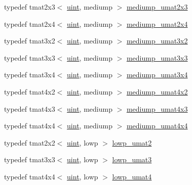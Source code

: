 \begin{DoxyCompactItemize}
typedef tmat2x3$<$ \hyperlink{stb__image_8c_a91ad9478d81a7aaf2593e8d9c3d06a14}{uint}, mediump $>$ \hyperlink{group__gtc__matrix__integer_ga23dfc19249ad27dc4b02615f1d045ba1}{mediump\+\_\+umat2x3}
\item 
typedef tmat2x4$<$ \hyperlink{stb__image_8c_a91ad9478d81a7aaf2593e8d9c3d06a14}{uint}, mediump $>$ \hyperlink{group__gtc__matrix__integer_ga972445669c6e6652716f3f0b664b94cd}{mediump\+\_\+umat2x4}
\item 
typedef tmat3x2$<$ \hyperlink{stb__image_8c_a91ad9478d81a7aaf2593e8d9c3d06a14}{uint}, mediump $>$ \hyperlink{group__gtc__matrix__integer_ga62243caa5b85b1cf91021ce6ffc21183}{mediump\+\_\+umat3x2}
\item 
typedef tmat3x3$<$ \hyperlink{stb__image_8c_a91ad9478d81a7aaf2593e8d9c3d06a14}{uint}, mediump $>$ \hyperlink{group__gtc__matrix__integer_gaa55f7815a399a780907a1dcd4caef7d9}{mediump\+\_\+umat3x3}
\item 
typedef tmat3x4$<$ \hyperlink{stb__image_8c_a91ad9478d81a7aaf2593e8d9c3d06a14}{uint}, mediump $>$ \hyperlink{group__gtc__matrix__integer_ga21a2361cc10822ad1a2297ac286c8e26}{mediump\+\_\+umat3x4}
\item 
typedef tmat4x2$<$ \hyperlink{stb__image_8c_a91ad9478d81a7aaf2593e8d9c3d06a14}{uint}, mediump $>$ \hyperlink{group__gtc__matrix__integer_ga9dd5ce011ca43d90cf1b94084c7e90ac}{mediump\+\_\+umat4x2}
\item 
typedef tmat4x3$<$ \hyperlink{stb__image_8c_a91ad9478d81a7aaf2593e8d9c3d06a14}{uint}, mediump $>$ \hyperlink{group__gtc__matrix__integer_gac91ed5aa76fe160d5ab5d31e2b94d95b}{mediump\+\_\+umat4x3}
\item 
typedef tmat4x4$<$ \hyperlink{stb__image_8c_a91ad9478d81a7aaf2593e8d9c3d06a14}{uint}, mediump $>$ \hyperlink{group__gtc__matrix__integer_ga7141a9d9f1c26521e397be34d19c1b8f}{mediump\+\_\+umat4x4}
\item 
typedef tmat2x2$<$ \hyperlink{stb__image_8c_a91ad9478d81a7aaf2593e8d9c3d06a14}{uint}, lowp $>$ \hyperlink{group__gtc__matrix__integer_ga0ff71fefa5bfab1462195c3de4f83f67}{lowp\+\_\+umat2}
\item 
typedef tmat3x3$<$ \hyperlink{stb__image_8c_a91ad9478d81a7aaf2593e8d9c3d06a14}{uint}, lowp $>$ \hyperlink{group__gtc__matrix__integer_ga71b66cc4f5e2d30b64ec99425562a6b6}{lowp\+\_\+umat3}
\item 
typedef tmat4x4$<$ \hyperlink{stb__image_8c_a91ad9478d81a7aaf2593e8d9c3d06a14}{uint}, lowp $>$ \hyperlink{group__gtc__matrix__integer_gaa430d894a3290d551061d0d77c017cec}{lowp\+\_\+umat4}
\item 

\end{DoxyCompactItemize}
